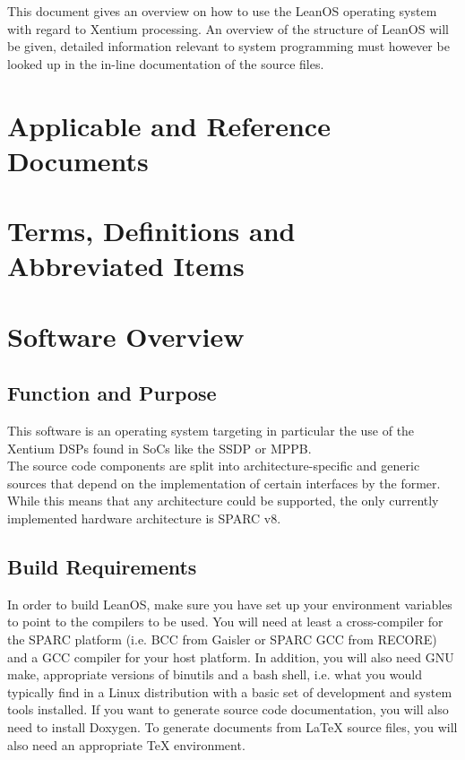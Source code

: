 This document gives an overview on how to use the LeanOS operating system with
regard to Xentium processing. An overview of the structure of LeanOS will be
given, detailed information relevant to system programming must however be 
looked up in the in-line documentation of the source files.

\chapter{Applicable and Reference Documents} %

\printbibliography[heading=none]


\chapter{Terms, Definitions and Abbreviated Items}
\printglossary[type=acronym]
\printglossary[type=main, style=altlist]



\chapter{Software Overview}

\section{Function and Purpose}

This software is an operating system targeting in particular the use of the
Xentium DSPs found in \glspl{SoC} like the \gls{SSDP} or \gls{MPPB}.
\\

The source code components are split into architecture-specific and generic
sources that depend on the implementation of certain interfaces by the former.
While this means that any architecture could be supported, the only
currently implemented hardware architecture is \gls{SPARC} v8.


\section {Build Requirements}

In order to build LeanOS, make sure you have set up your environment variables
to point to the compilers to be used. You will need at least a cross-compiler
for the \gls{SPARC} platform (i.e. BCC from Gaisler or SPARC GCC from RECORE)
and a \gls{GCC} compiler for your host platform. In addition, you will 
also need GNU make, appropriate versions of binutils and a bash shell, i.e.
what you would typically find in a Linux distribution with a basic set of
development and system tools installed. If you want to generate source code
documentation, you will also need to install \gls{Doxygen}. To generate
documents from LaTeX source files, you will also need an appropriate TeX
environment.

